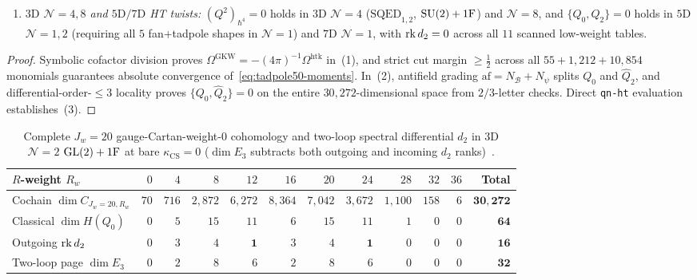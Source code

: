 \begin{theorem}[{$3\mathrm{D}$ $\mathcal{N}=2$ $\eps_2=-1$ orientation, $55$ \texttt{tadpole(5,0)} moments, $\GL(2)$ $J_w=20$, and $\mathcal{N}\ge 4$ HT twists~{\cite{CDG20,GKW,Repo9e833c8}}}]
\begin{enumerate}[label=(\arabic*),leftmargin=*]
  \item \emph{$3\mathrm{D}$ $\mathcal{N}=4,8$ and $5\mathrm{D}/7\mathrm{D}$ HT twists:} $(Q^2)_{\hbar^4} = 0$ holds in $3\mathrm{D}$ $\mathcal{N}=4$ ($\mathrm{SQED}_{1,2}$, $\operatorname{SU}(2)+1\mathrm{F}$) and $\mathcal{N}=8$, and $\{Q_0,Q_2\} = 0$ holds in $5\mathrm{D}$ $\mathcal{N}=1,2$ (requiring all $5$ fan+tadpole shapes in $\mathcal{N}=1$) and $7\mathrm{D}$ $\mathcal{N}=1$, with $\operatorname{rk} d_2 = 0$ across all $11$ scanned low-weight tables.
\end{enumerate}
\end{theorem}

\begin{proof}
Symbolic cofactor division proves $\Omega^{\mathrm{GKW}} = -(4\pi)^{-1}\Omega^{\mathrm{htk}}$ in~(1), and strict cut margin $\ge \frac{1}{2}$ across all $55 + 1{,}212 + 10{,}854$ monomials guarantees absolute convergence of~\eqref{eq:tadpole50-moments}. In~(2), antifield grading $\mathrm{af} = N_{\mathcal{B}}+N_\psi$ splits $Q_0$ and $\widehat{Q}_2$, and differential-order-$\le 3$ locality proves $\{Q_0,\widehat{Q}_2\}=0$ on the entire $30{,}272$-dimensional space from $2/3$-letter checks. Direct \texttt{qn-ht} evaluation establishes~(3).
\end{proof}

\begin{table}[H]
\centering
\scriptsize
\setlength{\tabcolsep}{5.2pt}
\renewcommand{\arraystretch}{1.14}
\begin{tabular}{@{}lrrrrrrrrrrr@{}}
\toprule
$R$-weight $R_w$ & $0$ & $4$ & $8$ & $12$ & $16$ & $20$ & $24$ & $28$ & $32$ & $36$ & \textbf{Total} \\
\midrule
Cochain $\dim C_{J_w=20, R_w}$ & $70$ & $716$ & $2{,}872$ & $6{,}272$ & $8{,}364$ & $7{,}042$ & $3{,}672$ & $1{,}100$ & $158$ & $6$ & $\mathbf{30{,}272}$ \\
Classical $\dim H(Q_0)$ & $0$ & $5$ & $15$ & $11$ & $6$ & $15$ & $11$ & $1$ & $0$ & $0$ & $\mathbf{64}$ \\
Outgoing $\operatorname{rk} d_2$ & $0$ & $3$ & $4$ & $\mathbf{1}$ & $3$ & $4$ & $\mathbf{1}$ & $0$ & $0$ & $0$ & $\mathbf{16}$ \\
Two-loop page $\dim E_3$ & $0$ & $2$ & $8$ & $6$ & $2$ & $8$ & $6$ & $0$ & $0$ & $0$ & $\mathbf{32}$ \\
\bottomrule
\end{tabular}
\caption{Complete $J_w = 20$ gauge-Cartan-weight-$0$ cohomology and two-loop spectral differential $d_2$ in $3\mathrm{D}$ $\mathcal{N}=2$ $\operatorname{GL}(2)+1\mathrm{F}$ at bare $\kappa_{\mathrm{CS}} = 0$ ($\dim E_3$ subtracts both outgoing and incoming $d_2$ ranks)~\cite{Repo9e833c8}.}
\label{tab:gl2-jw20}
\end{table}

